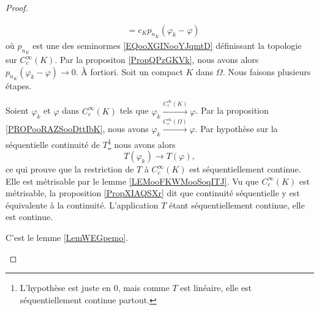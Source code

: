 \begin{proof}
\begin{subproof}
\begin{subequations}
\begin{align}
				                            & = c_Kp_{n_K}(\varphi_k-\varphi)
			\end{align}
		\end{subequations}
		où \( p_{n_K}\) est une des seminormes \eqref{EQooXGINooYJqmtD} définissant la topologie sur \( C^{\infty}_c(K)\). Par la propositon \ref{PropQPzGKVk}, nous avons alors \( p_{n_K}(\varphi_k-\varphi)\to 0\).
		\spitem[\ref{ITEMooBXFSooYtAXjy}\( \Rightarrow\) \ref{ITEMooXZJPooYyQQod}]
		À fortiori.
		\spitem[\ref{ITEMooXZJPooYyQQod}\( \Rightarrow\) \ref{ITEMooPTDMooHBrnXk}]
		Soit un compact \( K\) dans \( \Omega\). Nous faisons plusieurs étapes.
		\begin{subproof}
			Soient \( \varphi_k\) et \( \varphi\) dans \( C^{\infty}_c(K)\) tels que \( \varphi_{k}\stackrel{ C^{\infty}_c(K)}{\longrightarrow} \varphi\). Par la proposition \ref{PROPooRAZSooDttIbK}, nous avons \( \varphi_k\stackrel{ C^{\infty}_c(\Omega)}{\longrightarrow} \varphi\). Par hypothèse sur la séquentielle continuité de \( T\)\footnote{L'hypothèse est juste en \( 0\), mais comme \( T\) est linéaire, elle est séquentiellement continue partout.} nous avons alors
			\begin{equation}
				T(\varphi_k)\to T(\varphi),
			\end{equation}
			ce qui prouve que la restriction de \( T\) à \( C^{\infty}_c(K)\) est séquentiellement continue.
			Elle est métrisable par le lemme \ref{LEMooFKWMooSoqITJ}.
			\spitem[Conclusion]
			Vu que \( C^{\infty}_c(K)\) est métrisable, la proposition \ref{PropXIAQSXr} dit que continuité séquentielle y est équivalente à la continuité. L'application \( T\) étant séquentiellement continue, elle est continue.
		\end{subproof}
		\spitem[\ref{ITEMooPTDMooHBrnXk}\( \Rightarrow\) \ref{ITEMooQXXDooDleaQD}]
		C'est le lemme \ref{LemWEGpemo}.
	\end{subproof}
\end{proof}

